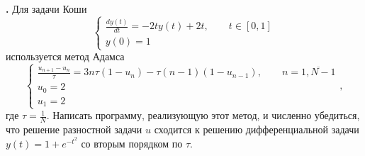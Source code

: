 \documentclass[12pt]{article}
\newcounter{task}
\newcommand{\problem}{\par\textbf{\stepcounter{task}\thetask. }}
\begin{document}
\problem Для задачи Коши
\[
\begin{cases}
\displaystyle\frac{dy(t)}{dt} = -2t y(t) + 2 t, \qquad t \in [0,1]\\
y(0) = 1
\end{cases}
\]
используется метод Адамса
\[
\begin{cases}
\displaystyle\frac{u_{n+1} - u_{n}}{\tau} = 3 n \tau(1 - u_n) - \tau  (n-1)(1 - u_{n-1}), \qquad n =
\overline{1, N-1}\\
u_0 = 2\\
u_1 = 2
\end{cases},
\]
где $\tau = \frac{1}{N}$.
Написать программу, реализующую этот метод, и численно убедиться, что решение
разностной задачи $u$ сходится к решению дифференциальной задачи $y(t) = 1 + e^{-t^2}$ со вторым порядком
по $\tau$.
\end{document}
